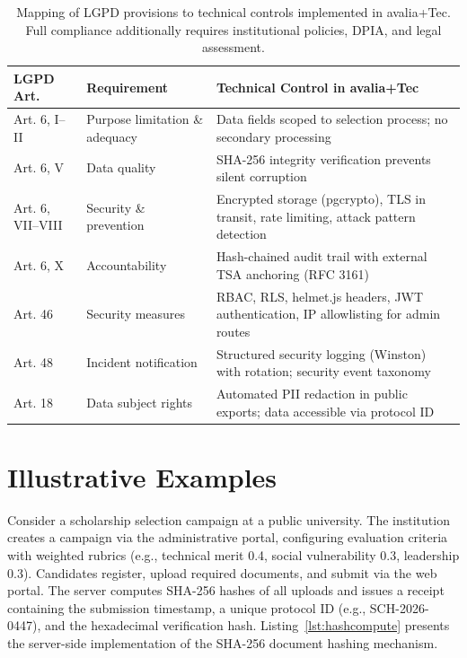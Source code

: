 \documentclass[preprint,12pt,a4paper]{elsarticle}
\begin{document}
\begin{table}[H]
\centering
\footnotesize
\begin{tabular}{|l|p{3.5cm}|p{5.5cm}|}
\hline
\textbf{LGPD Art.} & \textbf{Requirement} & \textbf{Technical Control in avalia+Tec} \\
\hline
Art. 6, I--II & Purpose limitation \& adequacy & Data fields scoped to selection process; no secondary processing \\
\hline
Art. 6, V & Data quality & SHA-256 integrity verification prevents silent corruption \\
\hline
Art. 6, VII--VIII & Security \& prevention & Encrypted storage (pgcrypto), TLS in transit, rate limiting, attack pattern detection \\
\hline
Art. 6, X & Accountability & Hash-chained audit trail with external TSA anchoring (RFC 3161) \\
\hline
Art. 46 & Security measures & RBAC, RLS, helmet.js headers, JWT authentication, IP allowlisting for admin routes \\
\hline
Art. 48 & Incident notification & Structured security logging (Winston) with rotation; security event taxonomy \\
\hline
Art. 18 & Data subject rights & Automated PII redaction in public exports; data accessible via protocol ID \\
\hline
\end{tabular}
\caption{Mapping of LGPD provisions to technical controls implemented in avalia+Tec. Full compliance additionally requires institutional policies, DPIA, and legal assessment.}
\label{tab:lgpdmapping}
\end{table}

\section{Illustrative Examples}

Consider a scholarship selection campaign at a public university. The institution creates a campaign via the administrative portal, configuring evaluation criteria with weighted rubrics (e.g., technical merit 0.4, social vulnerability 0.3, leadership 0.3). Candidates register, upload required documents, and submit via the web portal. The server computes SHA-256 hashes of all uploads and issues a receipt containing the submission timestamp, a unique protocol ID (e.g., SCH-2026-0447), and the hexadecimal verification hash. Listing~\ref{lst:hashcompute} presents the server-side implementation of the SHA-256 document hashing mechanism.
\end{document}
